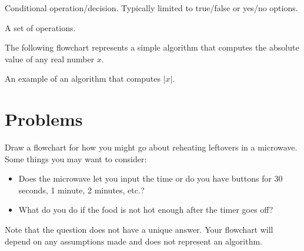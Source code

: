 \documentclass{ximera}
\begin{document}
\begin{center}
\end{center}
\begin{center}
	Conditional operation/decision. Typically limited to true/false or yes/no options.
\end{center}

\begin{center}
\end{center}
\begin{center}
	A set of operations.
\end{center}

The following flowchart represents a simple algorithm that computes the absolute value of any real number $x$.

\begin{center}
\end{center}
\begin{center}
	An example of an algorithm that computes $|x|$.
\end{center}

\section{Problems}

\begin{question}
	Draw a flowchart for how you might go about reheating leftovers in a microwave. Some things you may want to consider:
	\begin{itemize}
		\item Does the microwave let you input the time or do you have buttons for 30 seconds, 1 minute, 2 minutes, etc.?
		\item What do you do if the food is not hot enough after the timer goes off?
	\end{itemize}
	Note that the question does not have a unique answer. Your flowchart will depend on any assumptions made and does not represent an algorithm.
\end{question}
\end{document}
